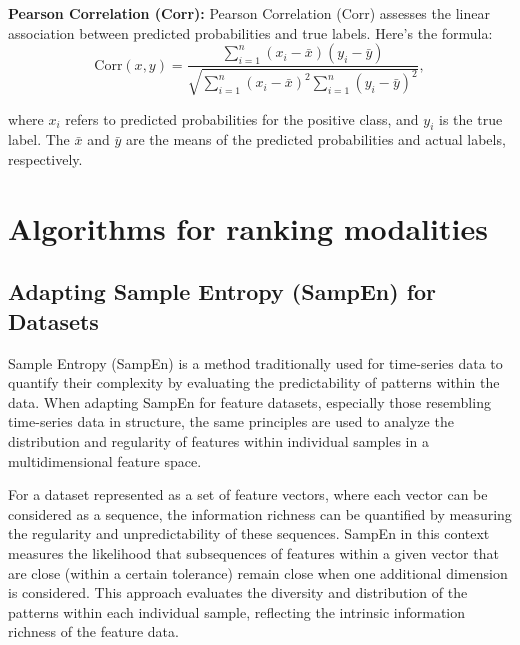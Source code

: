 \documentclass{article} %
\begin{document}
\textbf{Pearson Correlation (Corr):} Pearson Correlation (Corr) assesses the linear association between predicted probabilities and true labels. Here's the formula:
\begin{equation}
\text{Corr}(x, y)=\frac{ {\textstyle \sum_{i=1}^{n}}\left ( x_i-\bar{x} \right )\left ( y_i-\bar{y} \right )  }{\sqrt{ {\textstyle \sum_{i=1}^{n}}\left ( x_i-\bar{x} \right )^2{\textstyle \sum_{i=1}^{n}}\left ( y_i-\bar{y} \right )^2  } },\label{Corr}
\end{equation}

where $x_i$ refers to predicted probabilities for the positive class, and $y_i$ is the true label. The $\bar{x}$ and $\bar{y}$ are the means of the predicted probabilities and actual labels, respectively.




\section{Algorithms for ranking modalities}
\subsection{Adapting Sample Entropy (SampEn) for Datasets}

Sample Entropy (SampEn) is a method traditionally used for time-series data to quantify their complexity by evaluating the predictability of patterns within the data. When adapting SampEn for feature datasets, especially those resembling time-series data in structure, the same principles are used to analyze the distribution and regularity of features within individual samples in a multidimensional feature space.

For a dataset represented as a set of feature vectors, where each vector can be considered as a sequence, the information richness can be quantified by measuring the regularity and unpredictability of these sequences. SampEn in this context measures the likelihood that subsequences of features within a given vector that are close (within a certain tolerance) remain close when one additional dimension is considered. This approach evaluates the diversity and distribution of the patterns within each individual sample, reflecting the intrinsic information richness of the feature data.
\end{document}
